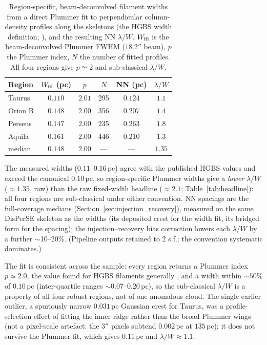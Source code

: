 \documentclass[usenatbib,twoside,twocolumn]{mnras}
\begin{document}
\begin{table}
\caption{Region-specific, beam-deconvolved filament widths from a direct Plummer fit to perpendicular column-density profiles along the skeletons (the HGBS width definition; \citealt{Arzoumanian2019}), and the resulting NN $\lambda/W$. $W_{\rm fil}$ is the beam-deconvolved Plummer FWHM ($18.2''$ beam), $p$ the Plummer index, $N$ the number of fitted profiles. All four regions give $p\simeq2$ and sub-classical $\lambda/W$.}
\label{tab:widths}
\footnotesize
\setlength{\tabcolsep}{3pt}
\begin{tabular}{p{1.7cm}ccccc}
\toprule
Region & $W_{\rm fil}$ (pc) & $p$ & $N$ & NN (pc) & $\lambda/W$ \\
\midrule
Taurus  & $0.110$ & $2.01$ & 295 & $0.124$ & $1.1$ \\
Orion B & $0.148$ & $2.00$ & 356 & $0.207$ & $1.4$ \\
Perseus & $0.147$ & $2.00$ & 235 & $0.263$ & $1.8$ \\
Aquila  & $0.161$ & $2.00$ & 446 & $0.210$ & $1.3$ \\
\midrule
median  & $0.148$ & $2.00$ & --- & --- & $1.35$ \\
\bottomrule
\end{tabular}
\par\vspace{2pt}
\footnotesize The measured widths ($0.11$--$0.16$\,pc) agree with the published HGBS values and exceed the canonical $0.10$\,pc, so region-specific Plummer widths give a \emph{lower} $\lambda/W$ ($\approx1.35$, raw) than the raw fixed-width headline ($\approx2.1$; Table~\ref{tab:headline}): all four regions are sub-classical under either convention. NN spacings are the full-coverage medians (Section~\ref{sec:injection_recovery}), measured on the same DisPerSE skeleton as the widths (its deposited crest for the width fit, its bridged form for the spacing); the injection--recovery bias correction lowers each $\lambda/W$ by a further $\sim$10--20\%. (Pipeline outputs retained to 2 s.f.; the convention systematic dominates.)
\end{table}

The fit is consistent across the sample: every region returns a Plummer index $p\simeq2.0$, the value found for HGBS filaments generally \citep{Arzoumanian2019}, and a width within $\sim50\%$ of $0.10$\,pc (inter-quartile ranges $\sim0.07$--$0.20$\,pc), so the sub-classical $\lambda/W$ is a property of all four robust regions, not of one anomalous cloud. The single earlier outlier, a spuriously narrow $0.031$\,pc Gaussian crest for Taurus, was a profile-selection effect of fitting the inner ridge rather than the broad Plummer wings (not a pixel-scale artefact: the $3''$ pixels subtend $0.002$\,pc at $135$\,pc); it does not survive the Plummer fit, which gives $0.11$\,pc and $\lambda/W\approx1.1$.
\end{document}
